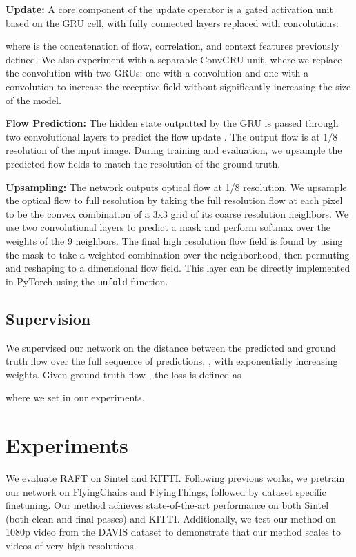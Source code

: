 \documentclass[runningheads]{llncs}
\begin{document}
\smallskip \noindent \textbf{Update: } A core component of the update operator is a gated activation unit based on the GRU cell, with fully connected layers replaced with convolutions:

where  is the concatenation of flow, correlation, and context features previously defined. We also experiment with a separable ConvGRU unit, where we replace the  convolution with two GRUs: one with a  convolution and one with a  convolution to increase the receptive field without significantly increasing the size of the model.

\smallskip \noindent \textbf{Flow Prediction: } The hidden state outputted by the GRU is passed through two convolutional layers to predict the flow update . The output flow is at 1/8 resolution of the input image. During training and evaluation, we upsample the predicted flow fields to match the resolution of the ground truth.

\smallskip \noindent \textbf{Upsampling: } The network outputs optical flow at 1/8 resolution. We upsample the optical flow to full resolution by taking the full resolution flow at each pixel to be the convex combination of a 3x3 grid of its coarse resolution neighbors. We use two convolutional layers to predict a  mask and perform softmax over the weights of the 9 neighbors. The final high resolution flow field is found by using the mask to take a weighted combination over the neighborhood, then permuting and reshaping to a  dimensional flow field. This layer can be directly implemented in PyTorch using the \texttt{unfold} function.

\subsection{Supervision}
We supervised our network on the  distance between the predicted and ground truth flow over the full sequence of predictions, , with exponentially increasing weights. Given ground truth flow , the loss is defined as

where we set  in our experiments.

\section{Experiments}
We evaluate RAFT on Sintel\cite{sintel} and KITTI\cite{kitti}. Following previous works, we pretrain our network on FlyingChairs\cite{flownet} and FlyingThings\cite{largedataset}, followed by dataset specific finetuning. Our method achieves state-of-the-art performance on both Sintel (both clean and final passes) and KITTI. Additionally, we test our method on 1080p video from the DAVIS dataset\cite{davis} to demonstrate that our method scales to  videos of very high resolutions. 
\end{document}

